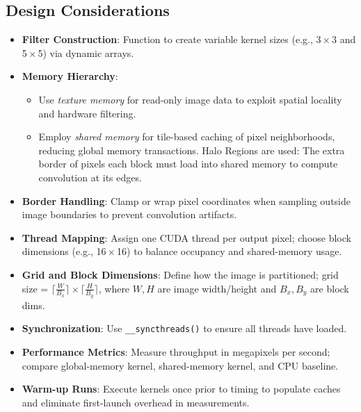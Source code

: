 \subsection{Design Considerations}
\begin{itemize}
  \item \textbf{Filter Construction}: Function to create variable kernel sizes (e.g., 3\,$\times$\,3 and 5\,$\times$\,5) via dynamic arrays.
  \item \textbf{Memory Hierarchy}:
    \begin{itemize}
      \item Use \emph{texture memory} for read-only image data to exploit spatial locality and hardware filtering. \parencite{nvidia2025ada}
      \item Employ \emph{shared memory} for tile-based caching of pixel neighborhoods, reducing global memory transactions. Halo Regions are used: The extra border of pixels each block must load into shared memory to compute convolution at its edges. 
    \end{itemize}
  \item \textbf{Border Handling}: Clamp or wrap pixel coordinates when sampling outside image boundaries to prevent convolution artifacts.
  \item \textbf{Thread Mapping}: Assign one CUDA thread per output pixel; choose block dimensions (e.g., 16\,$\times$\,16) to balance occupancy and shared-memory usage.
  \item \textbf{Grid and Block Dimensions}: Define how the image is partitioned; grid size = $\bigl\lceil\frac{W}{B_x}\bigr\rceil\times\bigl\lceil\frac{H}{B_y}\bigr\rceil$, where $W,H$ are image width/height and $B_x,B_y$ are block dims.
  \item \textbf{Synchronization}: Use \texttt{\_\_syncthreads()} to ensure all threads have loaded.
  \item \textbf{Performance Metrics}: Measure throughput in megapixels per second; compare global-memory kernel, shared-memory kernel, and CPU baseline.
  \item \textbf{Warm-up Runs}: Execute kernels once prior to timing to populate caches and eliminate first-launch overhead in measurements.
\end{itemize}

